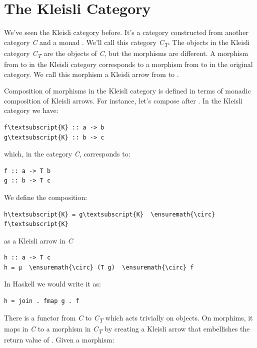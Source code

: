 \section{The Kleisli Category}\label{the-kleisli-category}

We've seen the Kleisli category before. It's a category constructed from
another category \emph{C} and a monad . We'll call this
category \emph{C\textsubscript{T}}. The objects in the Kleisli category
\emph{C\textsubscript{T}} are the objects of \emph{C}, but the morphisms
are different. A morphism  from  to  in
the Kleisli category corresponds to a morphism  from
 to  in the original category. We call this
morphism a Kleisli arrow from  to .

Composition of morphisms in the Kleisli category is defined in terms of
monadic composition of Kleisli arrows. For instance, let's compose
 after . In the Kleisli category we have:

\begin{Verbatim}[commandchars=\\\{\}]
f\textsubscript{K} :: a -> b
g\textsubscript{K} :: b -> c
\end{Verbatim}
which, in the category \emph{C}, corresponds to:

\begin{Verbatim}[commandchars=\\\{\}]
f :: a -> T b
g :: b -> T c
\end{Verbatim}
We define the composition:

\begin{Verbatim}[commandchars=\\\{\}]
h\textsubscript{K} = g\textsubscript{K}  \ensuremath{\circ} f\textsubscript{K}
\end{Verbatim}
as a Kleisli arrow in \emph{C}

\begin{Verbatim}[commandchars=\\\{\}]
h :: a -> T c
h = μ  \ensuremath{\circ} (T g)  \ensuremath{\circ} f
\end{Verbatim}
In Haskell we would write it as:

\begin{Verbatim}[commandchars=\\\{\}]
h = join . fmap g . f
\end{Verbatim}
There is a functor  from \emph{C} to \emph{C\textsubscript{T}}
which acts trivially on objects. On morphims, it maps  in
\emph{C} to a morphism in \emph{C\textsubscript{T}} by creating a
Kleisli arrow that embellishes the return value of . Given a
morphism:

